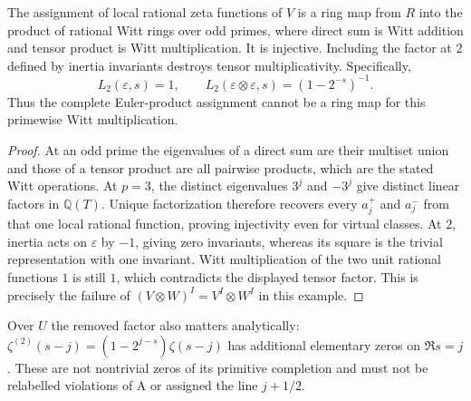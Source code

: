 \begin{proposition}
\label{AC-G05}
The assignment of local rational zeta functions of $V$ is a ring map
from $R$ into the product of rational Witt rings over odd primes,
where direct sum is Witt addition and tensor product is Witt multiplication.
It is injective.  Including the factor at $2$ defined by inertia
invariants destroys tensor multiplicativity.  Specifically,
\[
 L_2(\varepsilon,s)=1,
 \qquad L_2(\varepsilon\otimes\varepsilon,s)
 =(1-2^{-s})^{-1}.
\]
Thus the complete Euler-product assignment cannot be a ring map for this
primewise Witt multiplication.
\end{proposition}
\begin{proof}
At an odd prime the eigenvalues of a direct sum are their multiset union
and those of a tensor product are all pairwise products, which are the
stated Witt operations.  At $p=3$, the distinct eigenvalues $3^j$ and
$-3^j$ give distinct linear factors in $\mathbb Q(T)$.
Unique factorization therefore recovers every $a_j^+$ and $a_j^-$ from
that one local rational function, proving injectivity even for virtual
classes.  At $2$, inertia acts on $\varepsilon$ by $-1$, giving zero
invariants, whereas its square is the trivial representation with one
invariant.  Witt multiplication of the two unit rational functions
$1$ is still $1$, which contradicts the displayed tensor factor.
This is precisely the failure of
$(V\otimes W)^I=V^I\otimes W^I$ in this example.
\end{proof}

Over $U$ the removed factor also matters analytically:
$\zeta^{(2)}(s-j)=(1-2^{j-s})\zeta(s-j)$ has additional elementary
zeros on $\Re s=j$.  These are not nontrivial zeros of its primitive
completion and must not be relabelled violations of A or assigned the
line $j+1/2$.

